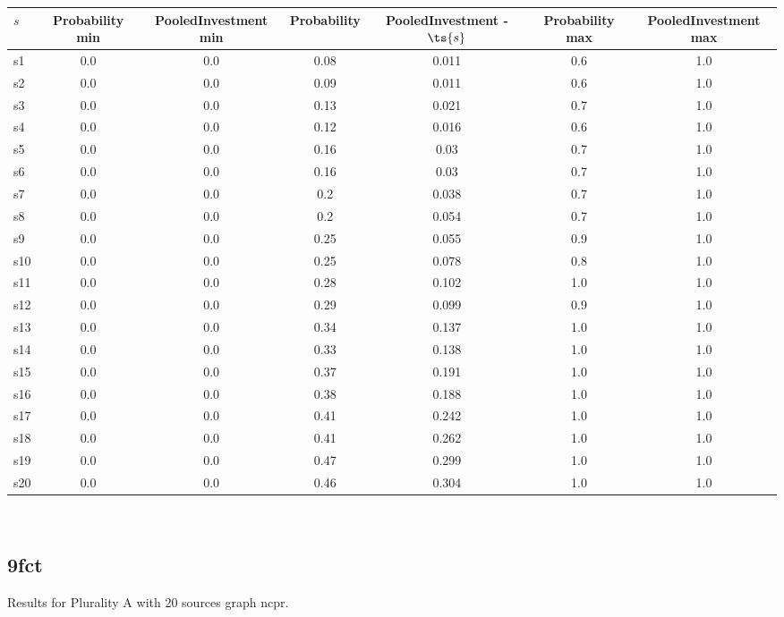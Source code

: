 \documentclass{article}
\begin{document}
\noindent\begin{tabular}{|l|c|c|c|c|c|c|}
\hline
$s$& Probability min & PooledInvestment min & Probability & PooledInvestment - $\ts{s}$ & Probability max & PooledInvestment max\\
\hline
s1 &0.0 & 0.0 & 0.08 & 0.011 & 0.6 & 1.0\\
\hline
s2 &0.0 & 0.0 & 0.09 & 0.011 & 0.6 & 1.0\\
\hline
s3 &0.0 & 0.0 & 0.13 & 0.021 & 0.7 & 1.0\\
\hline
s4 &0.0 & 0.0 & 0.12 & 0.016 & 0.6 & 1.0\\
\hline
s5 &0.0 & 0.0 & 0.16 & 0.03 & 0.7 & 1.0\\
\hline
s6 &0.0 & 0.0 & 0.16 & 0.03 & 0.7 & 1.0\\
\hline
s7 &0.0 & 0.0 & 0.2 & 0.038 & 0.7 & 1.0\\
\hline
s8 &0.0 & 0.0 & 0.2 & 0.054 & 0.7 & 1.0\\
\hline
s9 &0.0 & 0.0 & 0.25 & 0.055 & 0.9 & 1.0\\
\hline
s10 &0.0 & 0.0 & 0.25 & 0.078 & 0.8 & 1.0\\
\hline
s11 &0.0 & 0.0 & 0.28 & 0.102 & 1.0 & 1.0\\
\hline
s12 &0.0 & 0.0 & 0.29 & 0.099 & 0.9 & 1.0\\
\hline
s13 &0.0 & 0.0 & 0.34 & 0.137 & 1.0 & 1.0\\
\hline
s14 &0.0 & 0.0 & 0.33 & 0.138 & 1.0 & 1.0\\
\hline
s15 &0.0 & 0.0 & 0.37 & 0.191 & 1.0 & 1.0\\
\hline
s16 &0.0 & 0.0 & 0.38 & 0.188 & 1.0 & 1.0\\
\hline
s17 &0.0 & 0.0 & 0.41 & 0.242 & 1.0 & 1.0\\
\hline
s18 &0.0 & 0.0 & 0.41 & 0.262 & 1.0 & 1.0\\
\hline
s19 &0.0 & 0.0 & 0.47 & 0.299 & 1.0 & 1.0\\
\hline
s20 &0.0 & 0.0 & 0.46 & 0.304 & 1.0 & 1.0\\
\hline
\end{tabular}\\

\newpage

\subsection{9fct}

\noindent Results for Plurality A with 20 sources graph ncpr.
\end{document}
